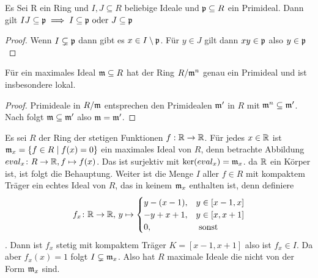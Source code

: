 \begin{Lemma}\label{Lem:PrimidealEig}
	Es Sei R ein Ring und \(I,J\subseteq R\) beliebige Ideale und \(\mathfrak{p}\subseteq R\) ein Primideal. Dann gilt 
	\(IJ\subseteq \mathfrak{p}\implies I\subseteq\mathfrak{p} \text{ oder } J\subseteq\mathfrak{p}\)
\end{Lemma}
\begin{proof}
	Wenn \(I\subsetneq \mathfrak{p}\) dann gibt es \(x\in I\setminus\mathfrak{p}\). Für \(y\in J\) gilt dann \(xy\in\mathfrak{p}\) also \(y\in\mathfrak{p}\)
\end{proof}
\begin{Kor}
	Für ein maximales Ideal \(\mathfrak{m}\subseteq R\) hat der Ring \(R/\mathfrak{m}^n\) genau ein Primideal und ist insbesondere lokal.
\end{Kor}
\begin{proof}
	Primideale in \(R/\mathfrak{m}\) entsprechen den Primidealen \(\mathfrak{m}'\) in \(R\) mit \(\mathfrak{m}^n\subseteq \mathfrak{m}'\). Nach  folgt \(\mathfrak{m}\subseteq \mathfrak{m}'\) also \(\mathfrak{m}=\mathfrak{m}'\). 
\end{proof}
\begin{Bsp}
	Es sei \(R\) der Ring der stetigen Funktionen \(f:\mathbb{R}\to \mathbb{R}\). Für jedes \(x\in \mathbb{R}\) ist \(\mathfrak{m}_x=\{f\in R\mid f(x)=0\}\) ein maximales Ideal von \(R\), denn betrachte Abbildung \(eval_x\colon R\to \mathbb{R}, f\mapsto f(x)\). Das ist surjektiv mit \(\ker(eval_x)=\mathfrak{m}_x\). da \(\mathbb{R}\) ein Körper ist, ist folgt die Behauptung.
	Weiter ist die Menge \(I\) aller \(f\in R\) mit kompaktem Träger ein echtes Ideal von \(R\), das in keinem \(\mathfrak{m}_x\) enthalten ist, denn definiere \[f_x\colon \mathbb{R}\to \mathbb{R},\, y\mapsto \begin{cases}
		y-(x-1), & y\in[x-1,x]\\
		-y+x+1, & y\in [x,x+1]\\
		0, & \text{ sonst }
	\end{cases}\]. Dann ist \(f_x\) stetig mit kompaktem Träger \(K=[x-1,x+1]\) also 
	ist \(f_x\in I\). Da aber \(f_x(x)=1\) folgt \(I\subsetneq \mathfrak{m}_x\). 
	Also hat \(R\) maximale Ideale die nicht von der Form \(\mathfrak{m}_x\) sind.
\end{Bsp}
